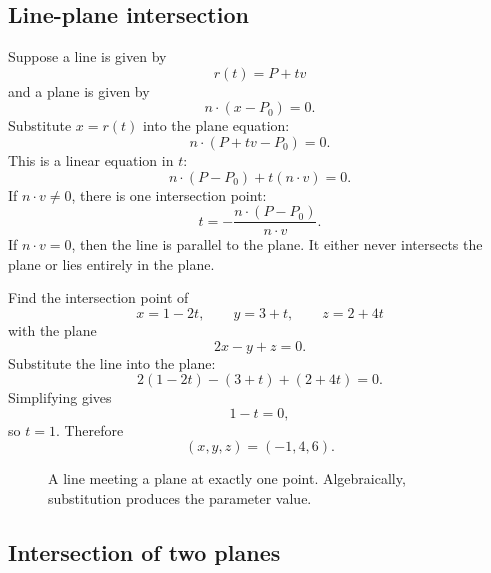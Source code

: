 \subsection{Line-plane intersection}

Suppose a line is given by
\[
  r(t)=P+tv
\]
and a plane is given by
\[
  n\cdot(x-P_0)=0.
\]
Substitute $x=r(t)$ into the plane equation:
\[
  n\cdot(P+tv-P_0)=0.
\]
This is a linear equation in $t$:
\[
  n\cdot(P-P_0)+t(n\cdot v)=0.
\]
If $n\cdot v\ne 0$, there is one intersection point:
\[
  t=-\frac{n\cdot(P-P_0)}{n\cdot v}.
\]
If $n\cdot v=0$, then the line is parallel to the plane. It either never intersects the plane or lies entirely in the plane.

\begin{examplebox}[title={Example 4.7: A line intersects a plane}]
Find the intersection point of
\[
  x=1-2t,\qquad y=3+t,\qquad z=2+4t
\]
with the plane
\[
  2x-y+z=0.
\]
Substitute the line into the plane:
\[
  2(1-2t)-(3+t)+(2+4t)=0.
\]
Simplifying gives
\[
  1-t=0,
\]
so $t=1$. Therefore
\[
  (x,y,z)=(-1,4,6).
\]
\end{examplebox}

\begin{figure}[H]
\centering
{}
\caption{A line meeting a plane at exactly one point. Algebraically, substitution produces the parameter value.}
\end{figure}

\subsection{Intersection of two planes}

